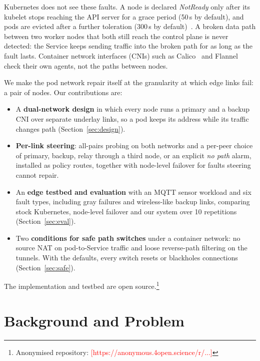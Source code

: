 \documentclass[conference,compsoc]{IEEEtran}
\newcommand{\tbd}[1]{\textcolor{red}{[#1]}}
\begin{document}
Kubernetes does not see these faults. A node is declared \emph{NotReady} only after
its kubelet stops reaching the API server for a grace period (50\,s by default), and
pods are evicted after a further toleration (300\,s by
default)~\cite{k8snodelifecycle}. A broken data path between two worker nodes that
both still reach the control plane is never detected: the Service keeps sending
traffic into the broken path for as long as the fault lasts. Container network
interfaces (CNIs) such as Calico~\cite{calico} and Flannel~\cite{flannel} check their
own agents, not the paths between nodes.

We make the pod network repair itself at the granularity at which edge links fail: a
pair of nodes. Our contributions are:
\begin{itemize}
  \item A \textbf{dual-network design} in which every node runs a primary and a
        backup CNI over separate underlay links, so a pod keeps its address while its
        traffic changes path (Section~\ref{sec:design}).
  \item \textbf{Per-link steering}: all-pairs probing on both networks and a
        per-peer choice of primary, backup, relay through a third node, or an explicit
        \emph{no path} alarm, installed as policy routes, together with node-level
        failover for faults steering cannot repair.
  \item An \textbf{edge testbed and evaluation} with an MQTT sensor workload and six
        fault types, including gray failures and wireless-like backup links,
        comparing stock Kubernetes, node-level failover and our system over 10
        repetitions (Section~\ref{sec:eval}).
  \item Two \textbf{conditions for safe path switches} under a container network: no
        source NAT on pod-to-Service traffic and loose reverse-path filtering on the
        tunnels. With the defaults, every switch resets or blackholes connections
        (Section~\ref{sec:safe}).
\end{itemize}
The implementation and testbed are open source.\footnote{Anonymised repository:
\tbd{https://anonymous.4open.science/r/...}}

\section{Background and Problem}
\label{sec:background}
\end{document}
